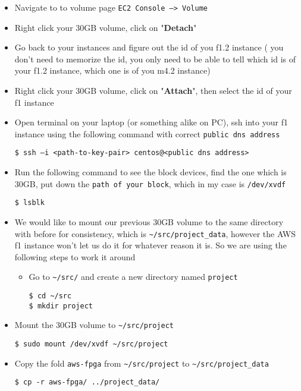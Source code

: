 \documentclass[]{article}
\begin{document}
\begin{itemize}
\item
  Navigate to to volume page
  \texttt{EC2\ Console\ —\textgreater{}\ Volume}
\item
  Right click your 30GB volume, click on "\textbf{Detach}"
\item
  Go back to your instances and figure out the id of you f1.2 instance (
  you don't need to memorize the id, you only need to be able to tell
  which id is of your f1.2 instance, which one is of you m4.2 instance)
\item
  Right click your 30GB volume, click on "\textbf{Attach}", then select
  the id of your f1 instance
\item
  Open terminal on your laptop (or something alike on PC), ssh into your
  f1 instance using the following command with correct
  \texttt{public\ dns\ address}

\begin{verbatim}
$ ssh –i <path-to-key-pair> centos@<public dns address>
\end{verbatim}
\item
  Run the following command to see the block devices, find the one which
  is 30GB, put down the \texttt{path\ of\ your\ block}, which in my case
  is \texttt{/dev/xvdf}

\begin{verbatim}
$ lsblk
\end{verbatim}
\item
  We would like to mount our previous 30GB volume to the same directory
  with before for consistency, which is
  \texttt{\textasciitilde{}/src/project\_data}, however the AWS f1
  instance won't let us do it for whatever reason it is. So we are using
  the following steps to work it around

  \begin{itemize}
  \item
    Go to \texttt{\textasciitilde{}/src/} and create a new directory
    named \texttt{project}

\begin{verbatim}
$ cd ~/src
$ mkdir project
\end{verbatim}
  \end{itemize}
\end{itemize}

\begin{itemize}
\item
  Mount the 30GB volume to \texttt{\textasciitilde{}/src/project}

\begin{verbatim}
$ sudo mount /dev/xvdf ~/src/project
\end{verbatim}
\item
  Copy the fold \texttt{aws-fpga} from
  \texttt{\textasciitilde{}/src/project} to
  \texttt{\textasciitilde{}/src/project\_data}

\begin{verbatim}
$ cp -r aws-fpga/ ../project_data/
\end{verbatim}
\end{itemize}
\end{document}

